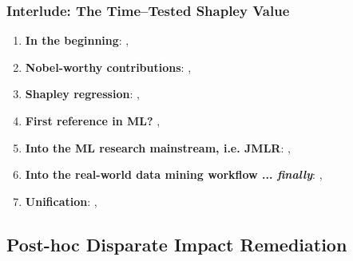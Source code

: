 \documentclass[11pt,
               aspectratio=169,
               hyperref={colorlinks}
               ]{beamer}
\begin{document}
			\begin{frame}
		
				\frametitle{Interlude: The Time--Tested Shapley Value}		
			
				\begin{enumerate}
				
					\item \textbf{In the beginning}: , 
					\item \textbf{Nobel-worthy contributions}: , 
					\item \textbf{Shapley regression}: , 
					\item \textbf{First reference in ML?} ,  	
					\item \textbf{Into the ML research mainstream, i.e. JMLR}: , 
					\item \textbf{Into the real-world data mining workflow ... \textit{finally}}: , 	
					\item \textbf{Unification}: , 	
				
				\end{enumerate}
			
			\end{frame}
			
		\subsection{Post-hoc Disparate Impact Remediation}
		
\end{document}
